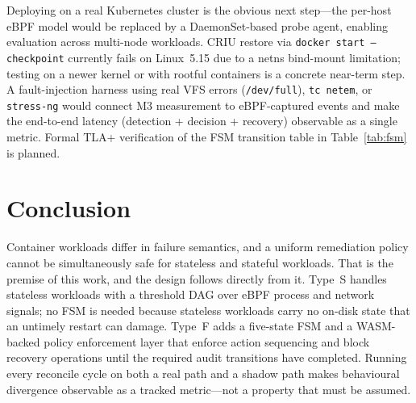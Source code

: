 \documentclass[conference]{IEEEtran}
\begin{document}
Deploying on a real Kubernetes cluster is the obvious next step---the per-host eBPF model would be replaced by a DaemonSet-based probe agent, enabling evaluation across multi-node workloads. CRIU restore via \texttt{docker start --checkpoint} currently fails on Linux~5.15 due to a netns bind-mount limitation; testing on a newer kernel or with rootful containers is a concrete near-term step. A fault-injection harness using real VFS errors (\texttt{/dev/full}), \texttt{tc netem}, or \texttt{stress-ng} would connect M3 measurement to eBPF-captured events and make the end-to-end latency (detection + decision + recovery) observable as a single metric. Formal TLA+ verification of the FSM transition table in Table~\ref{tab:fsm} is planned.

\section{Conclusion}
\label{sec:conclusion}

Container workloads differ in failure semantics, and a uniform remediation policy cannot be simultaneously safe for stateless and stateful workloads. That is the premise of this work, and the design follows directly from it. Type~S handles stateless workloads with a threshold DAG over eBPF process and network signals; no FSM is needed because stateless workloads carry no on-disk state that an untimely restart can damage. Type~F adds a five-state FSM and a WASM-backed policy enforcement layer that enforce action sequencing and block recovery operations until the required audit transitions have completed. Running every reconcile cycle on both a real path and a shadow path makes behavioural divergence observable as a tracked metric---not a property that must be assumed.
\end{document}
